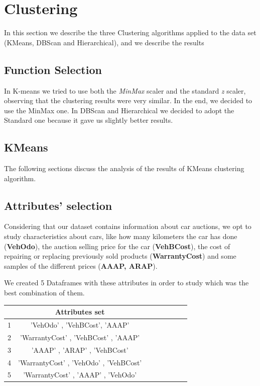 \documentclass{article}
\begin{document}
	
	
	\section{Clustering}
	\label{sec:clustering}
	In this section we describe the three Clustering algorithms applied to the data set (KMeans, DBScan and Hierarchical), and we describe the results
	
	\subsection{Function Selection}
	In K-means we tried to use both the \emph{MinMax} scaler and the standard \emph{z} scaler, observing that the clustering results were very similar. In the end, we decided to use the MinMax one.
	In DBScan and Hierarchical we decided to adopt the Standard one because it gave us slightly better results.
	
	\subsection{KMeans}
	The following sections discuss the analysis of the results of KMeans clustering algorithm.
	
	\subsection{Attributes' selection}
	Considering that our dataset contains information about car auctions, we opt to study characteristics about cars, like how many kilometers the car has done (\textbf{VehOdo}), the auction selling price for the car (\textbf{VehBCost}), the cost of repairing or replacing previously sold products (\textbf{WarrantyCost}) and some samples of the different prices (\textbf{AAAP, ARAP}).
	
	We created 5 Dataframes with these attributes in order to study which was the best combination of them.
	
	\begin{table}[H]
		\centering
		\begin{tabular}{c|ccccccc}
			\hline
			& Attributes set \\
			\hline
			\rowcolor{Gray}
			1 & 'VehOdo' ,  'VehBCost',  'AAAP' \\
			2 & 'WarrantyCost' , 'VehBCost' ,  'AAAP'  \\
			\rowcolor{Gray}
			3 & 'AAAP' ,  'ARAP' ,  'VehBCost' \\
			4 & 'WarrantyCost' ,  'VehOdo' ,  'VehBCost'  \\
			\rowcolor{Gray}
			5 & 'WarrantyCost' ,  'AAAP' , 'VehOdo' \\
		\end{tabular}
	\end{table}
	
\end{document}
